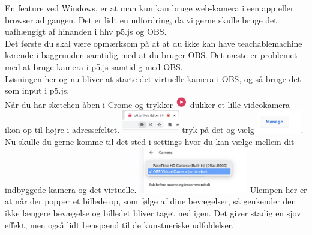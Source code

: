 \documentclass{ucph-handout}
\begin{document}
\begin{exercisebox}[adjusted title= Work-around til Windows]
En feature ved Windows, er at man kun kan bruge web-kamera i een app eller browser ad gangen. Det er lidt en udfordring, da vi gerne skulle bruge det uafhængigt af hinanden i hhv p5.js og OBS.\\

Det første du skal være opmærksom på at at du ikke kan have teachablemachine kørende i baggrunden samtidig med at du bruger OBS. Det næste er problemet med at bruge kamera i p5.js samtidig med OBS.\\

Løsningen her og nu bliver at starte det virtuelle kamera i OBS, og så bruge det som input i p5.js.\\

Når du har sketchen åben i Crome og trykker  \includegraphics[height=5mm]{ikoner/run.png} dukker et lille videokamera-ikon op til højre i adressefeltet. \includegraphics[height=10mm]{nyebilleder/videoikon.png} tryk på det og vælg \includegraphics[height=10mm]{nyebilleder/managevidoe.png}. \\

Nu skulle du gerne komme til det sted i settings hvor du kan vælge mellem dit indbyggede kamera og det virtuelle. \includegraphics[height=20mm]{nyebilleder/virtuel.png} Ulempen her er at når der popper et billede op, som følge af dine bevægelser, så genkender den ikke længere bevægelse og billedet bliver taget ned igen. Det giver stadig en sjov effekt, men også lidt benspænd til de kunstneriske udfoldelser.  
\vspace{3mm}

\end{exercisebox}
\end{document}
